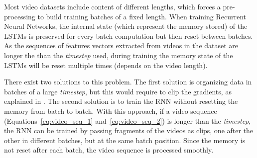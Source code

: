 Most video datasets include content of different lengths, which forces a pre-processing to build training batches of a fixed length. 
When training Recurrent Neural Networks, the internal state (which represent the memory stored) of the LSTMs is preserved for every batch computation but then reset between batches. As the sequences of features vectors extracted from videos in the dataset are longer the than the \textit{timestep} used, during training the memory state of the LSTMs will be reset multiple times (depends on the video length).




There exist two solutions to this problem. The first solution is organizing data in batches of a large \textit{timestep}, but this would require to clip the gradients, as explained in \cite{pascanu2012difficulty}. The second solution is to train the RNN without resetting the memory from batch to batch. With this approach, if a video sequence (Equations~\ref{eq:video_seq_1} and~\ref{eq:video_seq_2}) is longer than the \textit{timestep}, the RNN can be trained by passing fragments of the videos as clips, one after the other in different batches, but at the same batch position. Since the memory is not reset after each batch, the video sequence is processed smoothly. 

